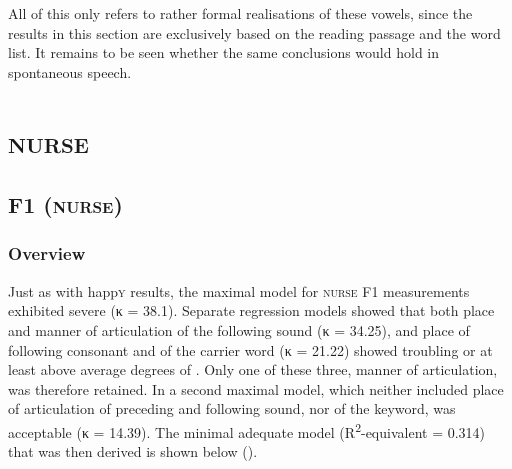All of this only refers to rather formal realisations of these vowels, since the results in this section are exclusively based on the reading passage and the word list.
It remains to be seen whether the same conclusions would hold in spontaneous speech.

\section{\textsc{nurse}}
\label{sec.prod.res.vow.nurse}

\subsection{F1 (\textsc{nurse})}
\label{sec.prod.res.vow.nurse.f1}

\subsubsection{Overview}
\label{sec.prod.res.vow.nurse.f1.overview}

Just as with happ\textsc{y} results, the maximal model for \textsc{nurse} F1 measurements exhibited severe  (κ = 38.1).
Separate regression models showed that both place and manner of articulation of the following sound (κ = 34.25), and place of following consonant and  of the carrier word (κ = 21.22) showed troubling or at least above average degrees of .
Only one of these three, manner of articulation, was therefore retained.
In a second maximal model, which neither included place of articulation of preceding and following sound, nor  of the keyword,  was acceptable (κ = 14.39).
The minimal adequate model (R\textsuperscript{2}-equivalent = 0.314) that was then derived is shown below ().

